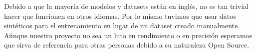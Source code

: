 \documentclass[../main.tex]{subfiles}
\begin{document}

Debido a que la mayoría de modelos y datasets están en inglés, no es tan trivial hacer que funcionen en otros idiomas.
Por lo mismo tuvimos que usar datos sintéticos para el entrenamiento en lugar de un dataset creado manualmente.
Aúnque nuestro proyecto no sea un hito en rendimiento o en precisión esperamos que sirva de referencia para otras personas debido a su naturaleza Open Source.

%
%
\end{document}
